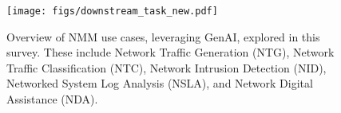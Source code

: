 
\begin{figure}[t]
    \centering
    \texttt{[image: figs/downstream\_task\_new.pdf]}
    \caption{
    Overview of NMM use cases, leveraging GenAI, explored in this survey. These include Network Traffic Generation (NTG), Network Traffic Classification (NTC), Network Intrusion Detection (NID), Networked System Log Analysis (NSLA), and Network Digital Assistance (NDA).
    }
    \label{fig: downstream}
\end{figure}




